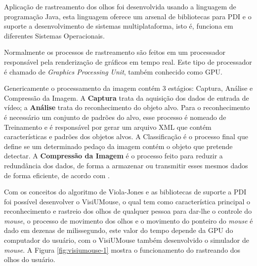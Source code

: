 Aplicação de rastreamento dos olhos foi desenvolvida usando a linguagem de programação Java, esta linguagem oferece um arsenal de bibliotecas para PDI e o suporte a desenvolvimento de sistemas multiplataforma, isto é, funciona em diferentes Sistemas Operacionais. 

Normalmente os processos de rastreamento são feitos em um processador responsável pela renderização de gráficos em tempo real. Este tipo de processador é chamado de \textit{Graphics Processing Unit}, também conhecido como GPU.

Genericamente o processamento da imagem contém 3 estágios: Captura, Análise e Compressão da Imagem. A \textbf{Captura} trata da aquisição dos dados de entrada de vídeo; a \textbf{Análise} trata do reconhecimento do objeto alvo. Para o reconhecimento é necessário um conjunto de padrões do alvo, esse processo é nomeado de Treinamento e é responsável por gerar um arquivo XML que contém características e padrões dos objetos alvos. A Classificação é o processo final que define se um determinado pedaço da imagem contém o objeto que pretende detectar. A \textbf{Compressão da Imagem} é o processo feito para reduzir a redundância dos dados, de forma a armazenar ou transmitir esses mesmos dados de forma eficiente, de acordo com .

Com os conceitos do algoritmo de Viola-Jones e as bibliotecas de suporte a PDI foi possível desenvolver o VisiUMouse, o qual tem como característica principal o reconhecimento e rastreio dos olhos de qualquer pessoa para dar-lhe o controle do \textit{mouse}, o processo de movimento dos olhos e o movimento do ponteiro do \textit{mouse} é dado em dezenas de milissegundo, este valor do tempo depende da GPU do computador do usuário, com o VisiUMouse também desenvolvido o simulador de \textit{mouse}. A Figura \ref{fig:visiumouse-1} mostra o funcionamento do rastreando dos olhos do usuário.
% 
% 

